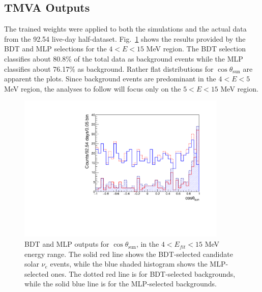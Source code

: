 
%

\subsection{TMVA Outputs}

The trained weights were applied to both the simulations and the actual data from the 92.54 live-day half-dataset.  Fig.~\ref{fig:cosThetaToSun_4to15_output} shows the results provided by the BDT and MLP selections for the $4<E<15$ MeV region. The BDT selection classifies about 80.8\% of the total data as background events while the MLP classifies about 76.17\% as background. Rather flat distributions for  $\cos\theta_\mathrm{sun}$ are apparent the plots. Since background events are predominant in the $4<E<5$ MeV region, the analyses to follow will focus only on the $5<E<15$ MeV region.

\begin{figure}[!htb]
	\centering
	\includegraphics[width=10cm]{cosThetaToSun_4to15_output.pdf}
	\caption[BDT and MLP outputs for the $\cos\theta_\mathrm{sun}$, with $4<E_{fit}<15$ MeV.]{BDT and MLP outputs for $\cos\theta_\mathrm{sun}$, in the $4<E_{fit}<15$ MeV energy range. The solid red line shows the BDT-selected candidate solar $\nu_e$ events, while the blue shaded histogram shows the MLP-selected ones. The dotted red line is for BDT-selected backgrounds, while the solid blue line is for the MLP-selected backgrounds.\label{fig:cosThetaToSun_4to15_output}}
\end{figure}

